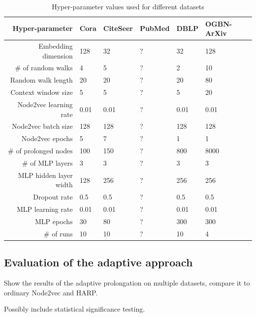 \begin{table}
  \caption{Hyper-parameter values used for different datasets}
  \label{tab:hyperparameter-values}
  \begin{tabular}{rlllll}
    \toprule
    Hyper-parameter        & Cora & CiteSeer & PubMed & DBLP & OGBN-ArXiv \\
    \midrule
    Embedding dimension    & 128  & 32       & ?      & 32   & 128        \\
    \# of random walks     & 4    & 5        & ?      & 2    & 10         \\
    Random walk length     & 20   & 20       & ?      & 20   & 80         \\
    Context window size    & 5    & 5        & ?      & 5    & 20         \\
    Node2vec learning rate & 0.01 & 0.01     & ?      & 0.01 & 0.01       \\
    Node2vec batch size    & 128  & 128      & ?      & 128  & 128        \\
    Node2vec epochs        & 5    & 7        & ?      & 1    & 1          \\
    \# of prolonged nodes  & 100  & 150      & ?      & 800  & 8000       \\
    \# of MLP layers       & 3    & 3        & ?      & 3    & 3          \\
    MLP hidden layer width & 128  & 256      & ?      & 256  & 256        \\
    Dropout rate           & 0.5  & 0.5      & ?      & 0.5  & 0.5        \\
    MLP learning rate      & 0.01 & 0.01     & ?      & 0.01 & 0.01       \\
    MLP epochs             & 30   & 80       & ?      & 300  & 300        \\
    \# of runs             & 10   & 10       & ?      & 10   & 4          \\
    \bottomrule
  \end{tabular}
\end{table}

\subsection{Evaluation of the adaptive approach}
Show the results of the adaptive prolongation on multiple datasets, compare it to ordinary Node2vec and HARP.

Possibly include statistical significance testing.

